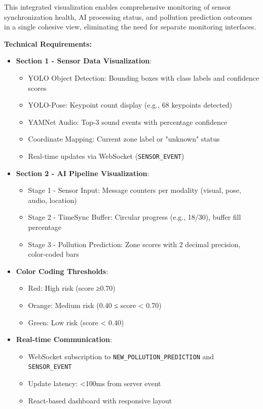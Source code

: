 \documentclass[conference]{IEEEtran}
\begin{document}
\begin{enumerate}
This integrated visualization enables comprehensive monitoring of sensor synchronization health, AI processing status, and pollution prediction outcomes in a single cohesive view, eliminating the need for separate monitoring interfaces.

\textbf{Technical Requirements:}
\begin{itemize}
    \item \textbf{Section 1 - Sensor Data Visualization}:
    \begin{itemize}
        \item YOLO Object Detection: Bounding boxes with class labels and confidence scores
        \item YOLO-Pose: Keypoint count display (e.g., 68 keypoints detected)
        \item YAMNet Audio: Top-3 sound events with percentage confidence
        \item Coordinate Mapping: Current zone label or "unknown" status
        \item Real-time updates via WebSocket (\texttt{SENSOR\_EVENT})
    \end{itemize}
    \item \textbf{Section 2 - AI Pipeline Visualization}:
    \begin{itemize}
        \item Stage 1 - Sensor Input: Message counters per modality (visual, pose, audio, location)
        \item Stage 2 - TimeSync Buffer: Circular progress (e.g., 18/30), buffer fill percentage
        \item Stage 3 - Pollution Prediction: Zone scores with 2 decimal precision, color-coded bars
    \end{itemize}
    \item \textbf{Color Coding Thresholds}:
    \begin{itemize}
        \item Red: High risk (score ≥0.70)
        \item Orange: Medium risk (0.40 ≤ score < 0.70)
        \item Green: Low risk (score < 0.40)
    \end{itemize}
    \item \textbf{Real-time Communication}:
    \begin{itemize}
        \item WebSocket subscription to \texttt{NEW\_POLLUTION\_PREDICTION} and \texttt{SENSOR\_EVENT}
        \item Update latency: <100ms from server event
        \item React-based dashboard with responsive layout
    \end{itemize}
\end{itemize}

\end{enumerate}
\end{document}
